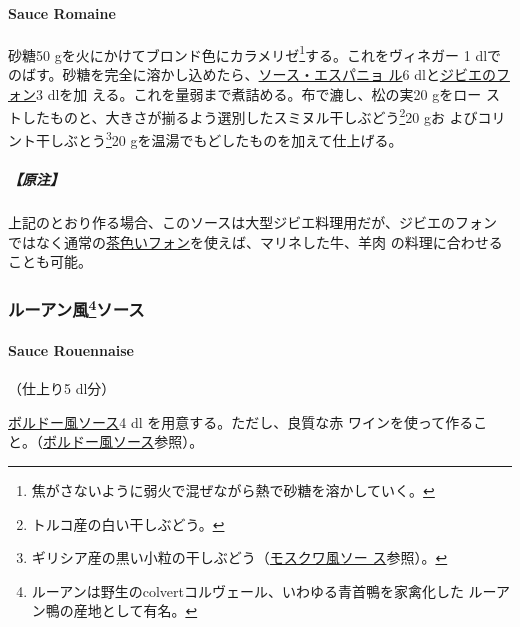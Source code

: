\begin{recette}
\hypertarget{sauce-romaine}{%
\paragraph{Sauce Romaine}\label{sauce-romaine}}

砂糖50 gを火にかけてブロンド色にカラメリゼ\footnote{焦がさないように弱火で混ぜながら熱で砂糖を溶かしていく。}する。これをヴィネガー
1\undemi{}
dlでのばす。砂糖を完全に溶かし込めたら、\protect\hyperlink{sauce-espagnole}{ソース・エスパニョ
ル}6 dlと\protect\hyperlink{fonds-de-gibier}{ジビエのフォン}3 dlを加
える。これを\troisquarts{}量弱まで煮詰める。布で漉し、松の実20 gをロー
ストしたものと、大きさが揃るよう選別したスミヌル干しぶどう\footnote{トルコ産の白い干しぶどう。}20
gお よびコリント干しぶとう\footnote{ギリシア産の黒い小粒の干しぶどう（\protect\hyperlink{sauce-moscovite}{モスクワ風ソー
  ス}参照）。}20 gを温湯でもどしたものを加えて仕上げる。

\hypertarget{ux539fux6ce8-8}{%
\subparagraph{【原注】}\label{ux539fux6ce8-8}}

上記のとおり作る場合、このソースは大型ジビエ料理用だが、ジビエのフォン
ではなく通常の\protect\hyperlink{fonds-brun}{茶色いフォン}を使えば、マリネした牛、羊肉
の料理に合わせることも可能。

\maeaki

\hypertarget{ux30ebux30fcux30a2ux30f3ux98a884ux30bdux30fcux30b9}{%
\subsubsection[ルーアン風ソース]{\texorpdfstring{ルーアン風\footnote{ルーアンは野生のcolvertコルヴェール、いわゆる青首鴨を家禽化した
  ルーアン鴨の産地として有名。}ソース}{ルーアン風ソース}}\label{ux30ebux30fcux30a2ux30f3ux98a884ux30bdux30fcux30b9}}

\hypertarget{sauce-rouennaise}{%
\paragraph{Sauce Rouennaise}\label{sauce-rouennaise}}

   

（仕上り5 dl分）

\protect\hyperlink{sauce-bordelaise}{ボルドー風ソース}4 dl
を用意する。ただし、良質な赤
ワインを使って作ること。（\protect\hyperlink{sauce-bordelaise}{ボルドー風ソース}参照）。


\end{recette}

